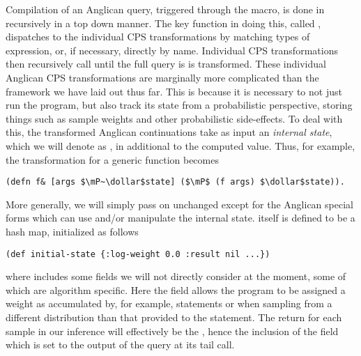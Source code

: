 Compilation of an Anglican query, triggered through the \query macro, is done in recursively
in a top down manner.  The key function in doing this, called ,
dispatches to the individual CPS transformations by matching types of expression, or, if necessary,
directly by name.  Individual CPS transformations then recursively call 
until the full query is is transformed.  
These individual Anglican CPS transformations are marginally more complicated than the
framework we have laid out thus far.  This is because it is necessary to not just run the
program, but also track its state from a probabilistic perspective, storing things such
as sample weights and other probabilistic side-effects.  To deal with this, the transformed Anglican
continuations take as input an \emph{internal state}, which we will denote as \angstate,
in additional to the computed value.
Thus, for example, the transformation for a generic function  becomes
\begin{lstlisting}[basicstyle=\ttfamily\small,frame=none]
  (defn f& [args $\mP~\dollar$state] ($\mP$ (f args) $\dollar$state)).
\end{lstlisting}\vspace{-8pt}
More generally, we will simply pass on \angstate unchanged except for the Anglican
special forms which can use and/or manipulate the internal state.  \angstate itself
is defined to be a hash map, initialized as follows
\begin{lstlisting}[basicstyle=\ttfamily\small,frame=none]
  (def initial-state {:log-weight 0.0 :result nil ...})
\end{lstlisting}\vspace{-8pt}
where  includes some fields we will not directly consider at the moment, some of which are algorithm
specific.
Here the field  allows the program to be assigned a
weight as accumulated by, for example, \observe statements or 
when sampling from a different distribution than that provided to the \sample statement.
The return for each sample in our inference will effectively be the \angstate, hence the inclusion
of the  field which is set to the output of the query at its tail call.


